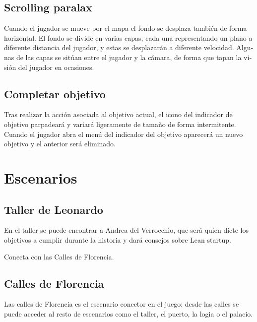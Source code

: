 \subsection[Scrolling paralax]{ Scrolling paralax}
\hypertarget{Toc484614256}{}{
\foreignlanguage{spanish}{Cuando el jugador se mueve por el mapa el fondo se desplaza tambi\'en de forma horizontal. El
fondo se divide en varias capas, cada una representando un plano a diferente distancia del jugador, y estas se
desplazar\'an a diferente velocidad. Algunas de las capas se sit\'uan entre el jugador y la c\'amara, de forma que
tapan la visi\'on del jugador en ocasiones.}}

\subsection[Completar objetivo]{ Completar objetivo}
\hypertarget{Toc484614257}{}{
Tras realizar la acci\'on asociada al objetivo actual, el icono del indicador de objetivo parpadear\'a y variar\'a
ligeramente de tama\~no de forma intermitente. Cuando el jugador abra el men\'u del indicador del objetivo aparecer\'a
un nuevo objetivo y el anterior ser\'a eliminado.}

\section[Escenarios]{ Escenarios}
\label{descripcionEscenarios}
\hypertarget{Toc484614258}{}\subsection[Taller de Leonardo]{ Taller de Leonardo}
\hypertarget{Toc484614259}{}{
En el taller se puede encontrar a Andrea del Verrocchio, que ser\'a quien dicte los objetivos a cumplir durante la
historia y dar\'a consejos sobre Lean startup.}

{
Conecta con las Calles de Florencia.}

\subsection[Calles de Florencia]{ Calles de Florencia}
\hypertarget{Toc484614260}{}{
Las calles de Florencia es el escenario conector en el juego: desde las calles se puede acceder al resto de escenarios
como el taller, el puerto, la logia o el palacio.}

